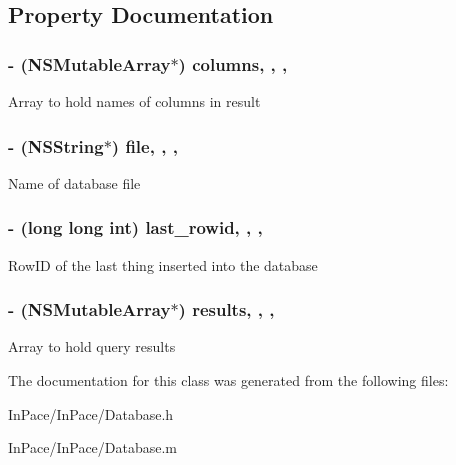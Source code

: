\subsection{Property Documentation}
\hypertarget{interfaceDatabase_a1bd01161d2f5a26a74edccc2288b5774}{
\subsubsection[{columns}]{\setlength{\rightskip}{0pt plus 5cm}-\/ (N\-S\-Mutable\-Array$\ast$) columns\hspace{0.3cm}{\ttfamily [read]}, {\ttfamily [write]}, {\ttfamily [atomic]}, {\ttfamily [retain]}}}\label{interfaceDatabase_a1bd01161d2f5a26a74edccc2288b5774}
Array to hold names of columns in result \hypertarget{interfaceDatabase_a430fb12f30886311e10ce028918c11fa}{
\subsubsection[{file}]{\setlength{\rightskip}{0pt plus 5cm}-\/ (N\-S\-String$\ast$) file\hspace{0.3cm}{\ttfamily [read]}, {\ttfamily [write]}, {\ttfamily [atomic]}, {\ttfamily [retain]}}}\label{interfaceDatabase_a430fb12f30886311e10ce028918c11fa}
Name of database file \hypertarget{interfaceDatabase_ac733c637b2bf08cae3005686867338f9}{
\subsubsection[{last\-\_\-rowid}]{\setlength{\rightskip}{0pt plus 5cm}-\/ (long long int) last\-\_\-rowid\hspace{0.3cm}{\ttfamily [read]}, {\ttfamily [write]}, {\ttfamily [atomic]}, {\ttfamily [assign]}}}\label{interfaceDatabase_ac733c637b2bf08cae3005686867338f9}
Row\-I\-D of the last thing inserted into the database \hypertarget{interfaceDatabase_aaf90264ccd741532c3b9258a82faa921}{
\subsubsection[{results}]{\setlength{\rightskip}{0pt plus 5cm}-\/ (N\-S\-Mutable\-Array$\ast$) results\hspace{0.3cm}{\ttfamily [read]}, {\ttfamily [write]}, {\ttfamily [atomic]}, {\ttfamily [retain]}}}\label{interfaceDatabase_aaf90264ccd741532c3b9258a82faa921}
Array to hold query results 

The documentation for this class was generated from the following files\-:\begin{DoxyCompactItemize}
\item 
In\-Pace/\-In\-Pace/Database.\-h\item 
In\-Pace/\-In\-Pace/Database.\-m\end{DoxyCompactItemize}
